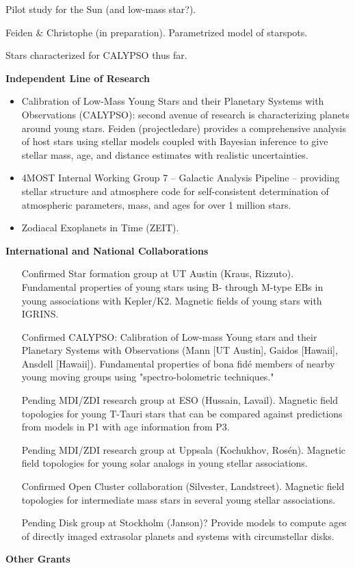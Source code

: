 \documentclass[12pt,a4paper]{article}
\begin{document}
Pilot study for the Sun (and low-mass star?).

Feiden \& Christophe (in preparation). Parametrized model of starspots.

Stars characterized for CALYPSO thus far.

{\bf \large Independent Line of Research}
\begin{itemize}
	\item Calibration of Low-Mass Young Stars and their Planetary Systems with Observations (CALYPSO): 
	second avenue of research is characterizing planets around young stars. 
    Feiden (projectledare) provides a comprehensive analysis of host stars using stellar models coupled 
    with Bayesian inference
    to give stellar mass, age, and distance estimates with realistic uncertainties.
	\item 4MOST Internal Working Group 7 -- Galactic Analysis Pipeline -- providing stellar
    structure and atmosphere code for self-consistent determination of atmospheric 
    parameters, mass, and ages for over 1 million stars.
    \item Zodiacal Exoplanets in Time (ZEIT).
\end{itemize}

{\bf \large International and National Collaborations}
\begin{itemize}
  	\item [Confirmed] Star formation group at UT Austin (Kraus, Rizzuto). Fundamental properties of young stars using B- through M-type EBs in young associations with Kepler/K2. Magnetic fields of young stars with IGRINS.
  	\item [Confirmed] CALYPSO: Calibration of Low-mass Young stars and their Planetary Systems with Observations (Mann [UT Austin], Gaidos [Hawaii], Ansdell [Hawaii]). Fundamental properties of bona fid\'{e} members of nearby young moving groups using "spectro-bolometric techniques."
  	\item [Pending] MDI/ZDI research group at ESO (Hussain, Lavail). Magnetic field topologies for young T-Tauri stars that can be compared against predictions from models in P1 with age information from P3.
  	\item [Pending] MDI/ZDI research group at Uppsala (Kochukhov, Ros\'{e}n). Magnetic field topologies for young solar analogs in young stellar associations.
  	\item [Confirmed] Open Cluster collaboration (Silvester, Landstreet). Magnetic field topologies for intermediate mass stars in several young stellar associations.
  	\item [Pending] Disk group at Stockholm (Janson)? Provide models to compute ages of directly imaged extrasolar planets and systems with circumstellar disks.
\end{itemize}


{\bf \large Other Grants}
\end{document}
